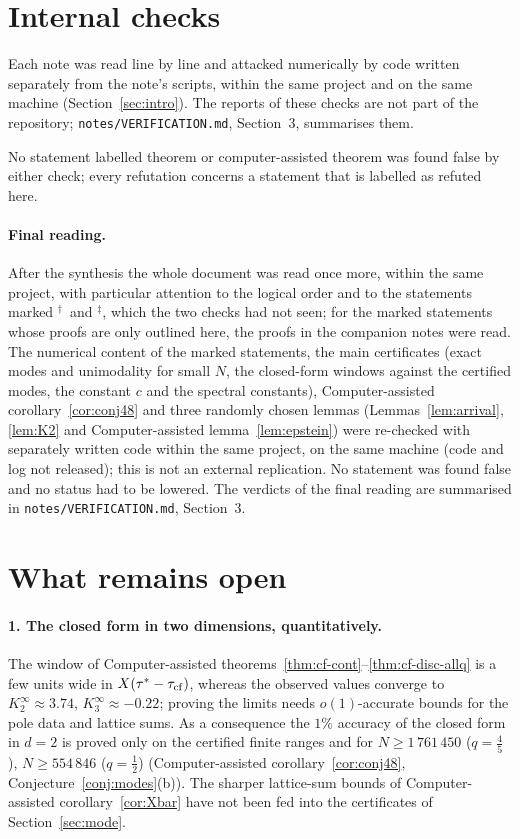 \documentclass[10pt,a4paper]{article}
\theoremstyle{plain}
\theoremstyle{definition}
\newcommand{\NEW}{\ensuremath{^{\dagger}}}       %
\newcommand{\SYN}{\ensuremath{^{\ddagger}}}      %
\begin{document}
\section{Internal checks}\label{sec:reviews}

Each note was read line by line and attacked numerically by code written separately from the note's scripts, within the same project and on the same machine (Section~\ref{sec:intro}). The reports of these checks are not part of the repository; \texttt{notes/VERIFICATION.md}, Section~3, summarises them.

No statement labelled theorem or computer-assisted theorem was found false by either check; every refutation concerns a statement that is labelled as refuted here.

\paragraph{Final reading.} After the synthesis the whole document was read once more, within the same project, with particular attention to the logical order and to the statements marked \NEW\ and \SYN, which the two checks had not seen; for the marked statements whose proofs are only outlined here, the proofs in the companion notes were read. The numerical content of the marked statements, the main certificates (exact modes and unimodality for small $N$, the closed-form windows against the certified modes, the constant $c$ and the spectral constants), Computer-assisted corollary~\ref{cor:conj48} and three randomly chosen lemmas (Lemmas~\ref{lem:arrival}, \ref{lem:K2} and Computer-assisted lemma~\ref{lem:epstein}) were re-checked with separately written code within the same project, on the same machine (code and log not released); this is not an external replication. No statement was found false and no status had to be lowered. The verdicts of the final reading are summarised in \texttt{notes/VERIFICATION.md}, Section~3.

\section{What remains open}\label{sec:open}

\paragraph{1. The closed form in two dimensions, quantitatively.} The window of Computer-assisted theorems~\ref{thm:cf-cont}--\ref{thm:cf-disc-allq} is a few units wide in $X(\tau^*-\tau_{\rm cf})$, whereas the observed values converge to $K_2^\infty\approx3.74$, $K_3^\infty\approx-0.22$; proving the limits needs $o(1)$-accurate bounds for the pole data and lattice sums. As a consequence the $1\%$ accuracy of the closed form in $d=2$ is proved only on the certified finite ranges and for $N\ge1\,761\,450$ ($q=\frac45$), $N\ge554\,846$ ($q=\frac12$) (Computer-assisted corollary~\ref{cor:conj48}, Conjecture~\ref{conj:modes}(b)). The sharper lattice-sum bounds of Computer-assisted corollary~\ref{cor:Xbar} have not been fed into the certificates of Section~\ref{sec:mode}.
\end{document}
